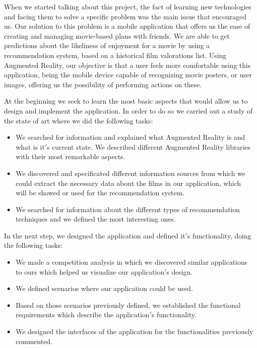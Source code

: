 When we started talking about this project, the fact of learning new technologies and facing them
to solve a specific problem was the main issue that encouraged us. 
Our solution to this problem is a mobile application that offers us the ease of 
creating and managing movie-based plans with friends. We are able to get predictions 
about the likeliness of enjoyment for a movie by using a recommendation system, based on 
a historical film valorations list. Using Augmented Reality, our objective is that a 
user feels more comfortable using this application, being the mobile device capable of recognizing 
movie posters, or user images, offering us the possibility of performing actions on these.

At the beginning we seek to learn the most basic aspects that would allow us to design
and implement the application. In order to do so we carried out a study of the state of art where we did the following tasks:
\begin{itemize}  
    \item We searched for information and explained what Augmented Reality is and what is it$'$s current state. We described different
     Augmented Reality libraries with their most remarkable aspects.
    \item We discovered and specificated different information sources from which we could extract the necessary data about the films in our application, which will be showed or used for the recommendation system.
    \item We searched for information about the different types of recommendation techniques and we defined the most interesting ones.
\end{itemize}

In the next step, we designed the application and defined it$'$s functionality, doing the following tasks:
\begin{itemize}
    \item We made a competition analysis in which we discovered similar applications to ours which helped us visualize our application$'$s design.
    \item We defined scenarios where our application could be used.
    \item Based on those scenarios previously defined, we established the functional requirements which describe the application$'$s functionality.
    \item We designed the interfaces of the application for the functionalities previously commented.
\end{itemize}

